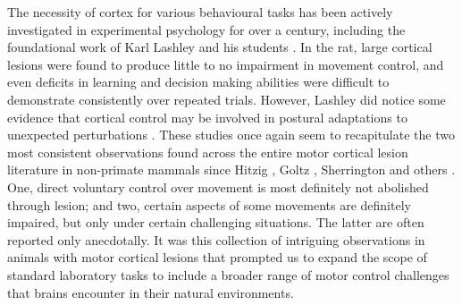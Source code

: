 The necessity of cortex for various behavioural tasks has been actively investigated in experimental psychology for over a century, including the foundational work of Karl Lashley and his students \cite{Lashley1921a,Lashley1950a}. In the rat, large cortical lesions were found to produce little to no impairment in movement control, and even deficits in learning and decision making abilities were difficult to demonstrate consistently over repeated trials. However, Lashley did notice some evidence that cortical control may be involved in postural adaptations to unexpected perturbations \cite{Lashley1921a}. These studies once again seem to recapitulate the two most consistent observations found across the entire motor cortical lesion literature in non-primate mammals since Hitzig \cite{Fritsch1870}, Goltz \cite{Goltz1888}, Sherrington \cite{Sherrington1885} and others \cite{Oakley1979,Terry1989}. One, direct voluntary control over movement is most definitely not abolished through lesion; and two, certain aspects of some movements are definitely impaired, but only under certain challenging situations. The latter are often reported only anecdotally. It was this collection of intriguing observations in animals with motor cortical lesions that prompted us to expand the scope of standard laboratory tasks to include a broader range of motor control challenges that brains encounter in their natural environments.
